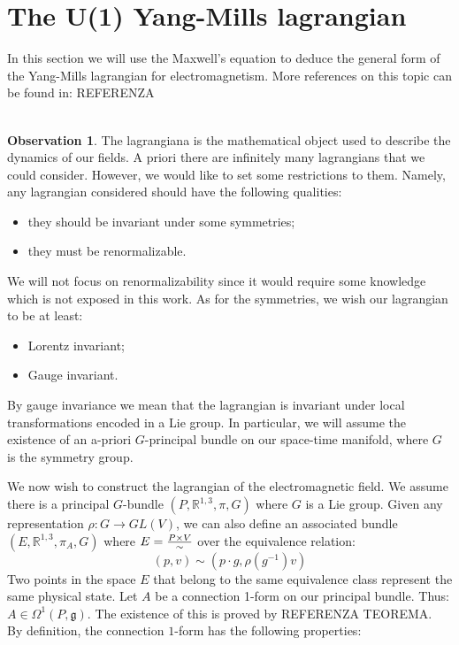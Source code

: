 \documentclass[12pt,a4paper]{report}
\theoremstyle{definition}
\theoremstyle{Theorem}
\theoremstyle{definition}
\theoremstyle{definition}
\newtheorem{Obs}[Def]{Observation}
\begin{document}
	\section{The U(1) Yang-Mills lagrangian}
	In this section we will use the Maxwell's equation to deduce the general form of the Yang-Mills lagrangian for electromagnetism. More references on this topic can be found in: REFERENZA
	\\
	\\
	\begin{Obs}
		The lagrangiana is the mathematical object used to describe the dynamics of our fields. A priori there are infinitely many lagrangians that we could consider. However, we would like to set some restrictions to them. Namely, any lagrangian considered should have the following qualities:
		\begin{itemize}
			\item they should be invariant under some symmetries;
			\item they must be renormalizable.
		\end{itemize}
		We will not focus on renormalizability since it would require some knowledge which is not exposed in this work. As for the symmetries, we wish our lagrangian to be at least:
		\begin{itemize}
			\item Lorentz invariant;
			\item Gauge invariant.
		\end{itemize}
		By gauge invariance we mean that the lagrangian is invariant under local transformations encoded in a Lie group. In particular, we will assume the existence of an a-priori $G$-principal bundle on our space-time manifold, where $G$ is the symmetry group. 
	\end{Obs}
	We now wish to construct the lagrangian of the electromagnetic field. We assume there is a principal $G$-bundle $(P,\mathbb{R}^{1,3},\pi,G)$ where $G$ is a Lie group. Given any representation $\rho:G\rightarrow GL(V)$, we can also define an associated bundle $(E,\mathbb{R}^{1,3},\pi_A,G)$ where $E={P\times V\over \sim}$ over the equivalence relation:
	$$(p,v)\sim(p\cdot g,\rho(g^{-1})v)$$
	Two points in the space $E$ that belong to the same equivalence class represent the same  physical state. Let $A$ be a connection 1-form on our principal bundle. Thus: $A\in\Omega^1(P,\mathfrak{g})$. The existence of this is proved by REFERENZA TEOREMA.\\
	By definition, the connection $1$-form has the following properties:
\end{document}
